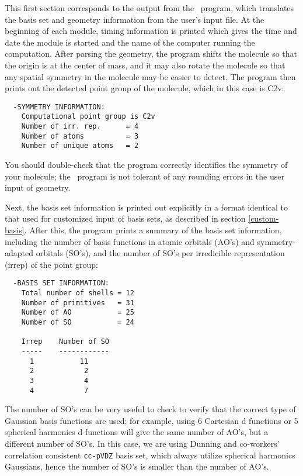 This first section corresponds to the output from the \PSIinput\ program,
which translates the basis set and geometry information from the user's
input file.  At the beginning of each module, timing information is
printed which gives the time and date the module is started and the name
of the computer running the computation.  After parsing the geometry, the
program shifts the molecule so that the origin is at the center of mass,
and it may also rotate the molecule so that any spatial symmetry in the 
molecule may be easier to detect.  The program then prints out the 
detected point group of the molecule, which in this case is C2v:
\begin{verbatim}
  -SYMMETRY INFORMATION:
    Computational point group is C2v
    Number of irr. rep.      = 4
    Number of atoms          = 3
    Number of unique atoms   = 2
\end{verbatim}
You should double-check that the program correctly identifies the symmetry
of your molecule; the \PSIthree\ program is not tolerant of any rounding 
errors in the user input of geometry.

Next, the basis set information is printed out explicitly in a format
identical to that used for customized input of basis sets, as described
in section \ref{custom-basis}.  After this, the program prints a summary
of the basis set information, including the number of basis functions
in atomic orbitals (AO's) and symmetry-adapted orbitals (SO's), and
the number of SO's per irredicible representation (irrep) of the point group:
\begin{verbatim}
  -BASIS SET INFORMATION:
    Total number of shells = 12
    Number of primitives   = 31
    Number of AO           = 25
    Number of SO           = 24
                                                                                
    Irrep    Number of SO
    -----    ------------
      1           11
      2            2
      3            4
      4            7
\end{verbatim}
The number of SO's can be very useful to check to verify that the
correct type of Gaussian basis functions are used; for example, using 
6 Cartesian d functions or 5 spherical harmonics 
d functions will 
give the same number of AO's, but a different number of SO's.
In this case, we are using Dunning and co-workers' correlation consistent
{\tt cc-pVDZ} basis set, which always utilize spherical harmonics
Gaussians, hence the number of SO's is smaller than the number
of AO's.

